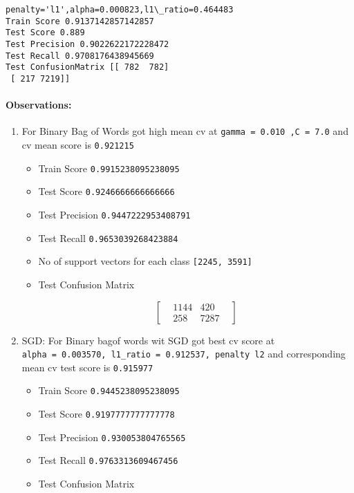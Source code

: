\documentclass[11pt]{article}
\providecommand{\tightlist}{%
      \setlength{\itemsep}{0pt}\setlength{\parskip}{0pt}}
\begin{document}
    \begin{Verbatim}[commandchars=\\\{\}]
penalty='l1',alpha=0.000823,l1\_ratio=0.464483
Train Score 0.9137142857142857
Test Score 0.889
Test Precision 0.9022622172228472
Test Recall 0.9708176438945669
Test ConfusionMatrix [[ 782  782]
 [ 217 7219]]

    \end{Verbatim}

    \paragraph{\texorpdfstring{Observations:}{Observations: }}\label{observations}

\begin{enumerate}
\def\labelenumi{\arabic{enumi}.}
\tightlist
\item
  For Binary Bag of Words got high mean cv at
  \texttt{gamma\ =\ 0.010\ ,C\ =\ 7.0} and cv mean score is
  \texttt{0.921215}

  \begin{itemize}
  \tightlist
  \item
    Train Score \texttt{0.9915238095238095}
  \item
    Test Score \texttt{0.9246666666666666}
  \item
    Test Precision \texttt{0.9447222953408791}
  \item
    Test Recall \texttt{0.9653039268423884}
  \item
    No of support vectors for each class \texttt{{[}2245,\ 3591{]}}
  \item
    Test Confusion Matrix

    \begin{equation}
    \begin{bmatrix}
    & 1144 & 420 &  \\
    & 258 & 7287 & 
    \end{bmatrix}
    \end{equation}
  \end{itemize}
\item
  SGD: For Binary bagof words wit SGD got best cv score at
  \texttt{alpha\ =\ 0.003570,\ l1\_ratio\ =\ 0.912537,\ penalty\ l2} and
  corresponding mean cv test score is \texttt{0.915977}

  \begin{itemize}
  \tightlist
  \item
    Train Score \texttt{0.9445238095238095}
  \item
    Test Score \texttt{0.9197777777777778}
  \item
    Test Precision \texttt{0.930053804765565}
  \item
    Test Recall \texttt{0.9763313609467456}
  \item
    Test Confusion Matrix


\end{itemize}
\end{enumerate}
\end{document}
